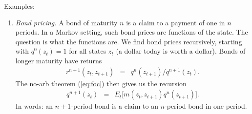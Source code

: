 \documentclass[11pt]{article}
\begin{document}
Examples:
%
\begin{enumerate}

\begin{comment}
\item {\it Discounting cash flows.\/}
We can represent equity valuation as either an infinite discounted present value or a sequence.
In the former, we might treat equity at date $t$
as a claim to the dividend stream $d_{t+1}, d_{t+2}, \ldots $
and discount them with the discount factor $\delta$:
\begin{eqnarray*}
    v_t &=& \sum_{j=1}^\infty \delta^j d_{t+j} ,
\end{eqnarray*}
In a finance course we would typically replace $\delta$ with $1/(1+i)$, but this is more compact.

Here's a recursive version where we add one dividend at a time.
Consider the sequence
\begin{eqnarray}
    v_t^{n+1} &=& \delta (d_{t+1} + v^n_{t+1} ) ,
    \label{eq:equity-deterministic}
\end{eqnarray}
starting with $v^0_t = 0$.
That gives us the sequence
\begin{eqnarray*}
    v^1_t &=& \delta (d_{t+1} + v^0_{t+1}) \;\;=\;\; \delta d_{t+1}  \\
    v^2_t &=& \delta (d_{t+1} + v^1_{t+1}) \;\;=\;\; \delta d_{t+1} + \delta^2 d_{t+2} ,
\end{eqnarray*}
and so on.
The limit of this sequence is the infinite sum.
\end{comment}


\item {\it Bond pricing.\/}
A bond of maturity $n$ is a claim to a payment of one in $n$ periods.
In a Markov setting, such bond prices are functions of the state.
The question is what the functions are.
%
We find bond prices recursively, starting with $q^0(z_t) = 1$ for
all states $z_t$ (a dollar today is worth a dollar).
Bonds of longer maturity have returns 
\begin{eqnarray*}
    r^{n+1}(z_t, z_{t+1}) &=& q^{n}(z_{t+1}) / q^{n+1}(z_{t}) .
\end{eqnarray*} 
The no-arb theorem (\ref{eq:foc}) then gives us the recursion 
\begin{eqnarray}
    q^{n+1}(z_t) &=& E_t \big[ m(z_t,z_{t+1}) q^n(z_{t+1})\big] .
    \label{eq:recursion-bond}
\end{eqnarray}
In words:  an $n+1$-period bond is a claim to an $n$-period bond in one period.


\end{enumerate}
\end{document}
